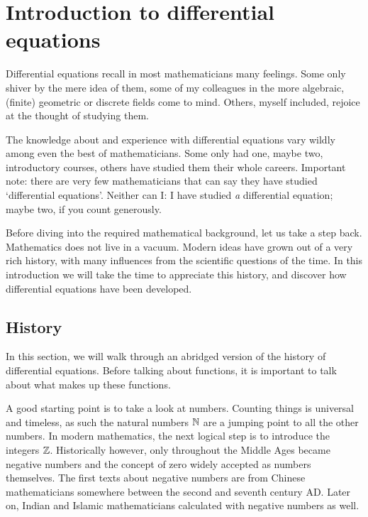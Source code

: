 


\chapter{Introduction to differential equations}

Differential equations recall in most mathematicians many feelings. Some only shiver by the mere idea of them, some of my colleagues in the more algebraic, (finite) geometric or discrete fields come to mind. Others, myself included, rejoice at the thought of studying them.

The knowledge about and experience with differential equations vary wildly among even the best of mathematicians. Some only had one, maybe two, introductory courses, others have studied them their whole careers. Important note: there are very few mathematicians that can say they have studied `differential equations'. Neither can I: I have studied \emph{a} differential equation; maybe two, if you count generously.

Before diving into the required mathematical background, let us take a step back. Mathematics does not live in a vacuum. Modern ideas have grown out of a very rich history, with many influences from the scientific questions of the time. In this introduction we will take the time to appreciate this history, and discover how differential equations have been developed.

\section{History}

In this section, we will walk through an abridged version of the history of differential equations. Before talking about functions, it is important to talk about what makes up these functions.

A good starting point is to take a look at numbers. Counting things is universal and timeless, as such the natural numbers $\mathbb{N}$ are a jumping point to all the other numbers. In modern mathematics, the next logical step is to introduce the integers $\mathbb{Z}$. Historically however, only throughout the Middle Ages became negative numbers and the concept of zero widely accepted as numbers themselves. The first texts about negative numbers are from Chinese mathematicians somewhere between the second and seventh century AD. Later on, Indian and Islamic mathematicians calculated with negative numbers as well.

